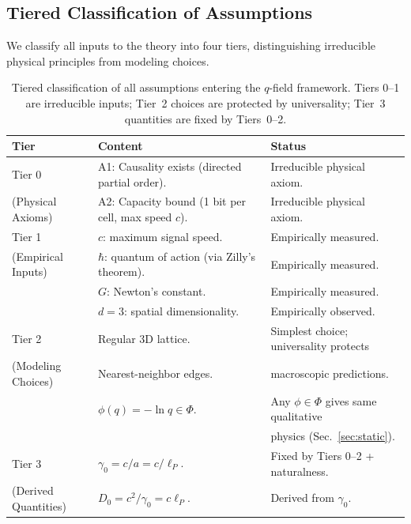 \documentclass[aps,prd,twocolumn,showpacs,superscriptaddress,preprintnumbers]{revtex4-2}
\begin{document}
\subsection{Tiered Classification of Assumptions}
\label{sec:tiered}

We classify all inputs to the theory into four tiers, distinguishing irreducible physical principles from modeling choices.

\begin{table}[h]
\centering
\caption{Tiered classification of all assumptions entering the $q$-field framework. Tiers 0--1 are irreducible inputs; Tier~2 choices are protected by universality; Tier~3 quantities are fixed by Tiers~0--2.}
\label{tab:tiers}
\begin{tabular}{p{}p{}p{}}
\toprule
\textbf{Tier} & \textbf{Content} & \textbf{Status} \\
\midrule
Tier 0 & A1: Causality exists (directed partial order). & Irreducible physical axiom. \\
(Physical Axioms) & A2: Capacity bound (1 bit per cell, max speed $c$). & Irreducible physical axiom. \\
\midrule
Tier 1 & $c$: maximum signal speed. & Empirically measured. \\
(Empirical Inputs) & $\hbar$: quantum of action (via Zilly's theorem). & Empirically measured. \\
& $G$: Newton's constant. & Empirically measured. \\
& $d=3$: spatial dimensionality. & Empirically observed. \\
\midrule
Tier 2 & Regular 3D lattice. & Simplest choice; universality protects \\
(Modeling Choices) & Nearest-neighbor edges. & macroscopic predictions. \\
& $\phi(q)=-\ln q \in \Phi$. & Any $\phi\in\Phi$ gives same qualitative \\
& & physics (Sec.~\ref{sec:static}). \\
\midrule
Tier 3 & $\gamma_0 = c/a = c/\ell_P$. & Fixed by Tiers 0--2 + naturalness. \\
(Derived Quantities) & $D_0 = c^2/\gamma_0 = c\ell_P$. & Derived from $\gamma_0$. \\
\bottomrule
\end{tabular}
\end{table}
\end{document}
